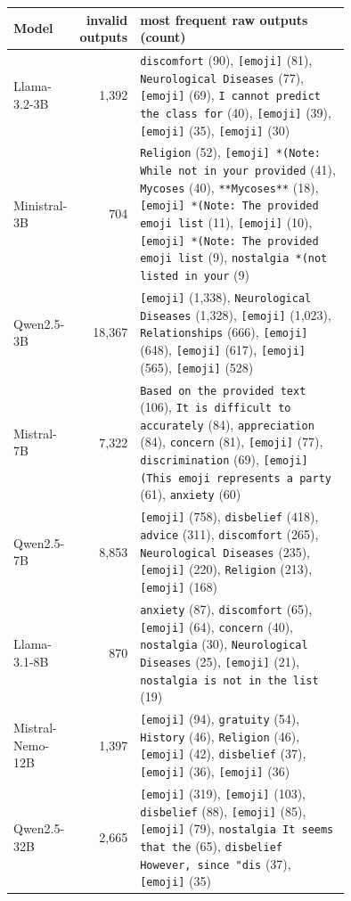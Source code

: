 \begin{tabular}{lrp{0.75\linewidth}}
\toprule
Model & invalid outputs & most frequent raw outputs (count) \\
\midrule
Llama-3.2-3B & 1,392 & \texttt{discomfort} (90), \texttt{[emoji]} (81), \texttt{Neurological Diseases} (77), \texttt{[emoji]} (69), \texttt{I cannot predict the class for} (40), \texttt{[emoji]} (39), \texttt{[emoji]} (35), \texttt{[emoji]} (30) \\
Ministral-3B & 704 & \texttt{Religion} (52), \texttt{[emoji] *(Note: While not in your provided} (41), \texttt{Mycoses} (40), \texttt{**Mycoses**} (18), \texttt{[emoji] *(Note: The provided emoji list} (11), \texttt{[emoji]} (10), \texttt{[emoji] *(Note: The provided emoji list} (9), \texttt{nostalgia *(not listed in your} (9) \\
Qwen2.5-3B & 18,367 & \texttt{[emoji]} (1,338), \texttt{Neurological Diseases} (1,328), \texttt{[emoji]} (1,023), \texttt{Relationships} (666), \texttt{[emoji]} (648), \texttt{[emoji]} (617), \texttt{[emoji]} (565), \texttt{[emoji]} (528) \\
Mistral-7B & 7,322 & \texttt{Based on the provided text} (106), \texttt{It is difficult to accurately} (84), \texttt{appreciation} (84), \texttt{concern} (81), \texttt{[emoji]} (77), \texttt{discrimination} (69), \texttt{[emoji] (This emoji represents a party} (61), \texttt{anxiety} (60) \\
Qwen2.5-7B & 8,853 & \texttt{[emoji]} (758), \texttt{disbelief} (418), \texttt{advice} (311), \texttt{discomfort} (265), \texttt{Neurological Diseases} (235), \texttt{[emoji]} (220), \texttt{Religion} (213), \texttt{[emoji]} (168) \\
Llama-3.1-8B & 870 & \texttt{anxiety} (87), \texttt{discomfort} (65), \texttt{[emoji]} (64), \texttt{concern} (40), \texttt{nostalgia} (30), \texttt{Neurological Diseases} (25), \texttt{[emoji]} (21), \texttt{nostalgia is not in the list} (19) \\
Mistral-Nemo-12B & 1,397 & \texttt{[emoji]} (94), \texttt{gratuity} (54), \texttt{History} (46), \texttt{Religion} (46), \texttt{[emoji]} (42), \texttt{disbelief} (37), \texttt{[emoji]} (36), \texttt{[emoji]} (36) \\
Qwen2.5-32B & 2,665 & \texttt{[emoji]} (319), \texttt{[emoji]} (103), \texttt{disbelief} (88), \texttt{[emoji]} (85), \texttt{[emoji]} (79), \texttt{nostalgia It seems that the} (65), \texttt{disbelief However, since "dis} (37), \texttt{[emoji]} (35) \\
\bottomrule
\end{tabular}
